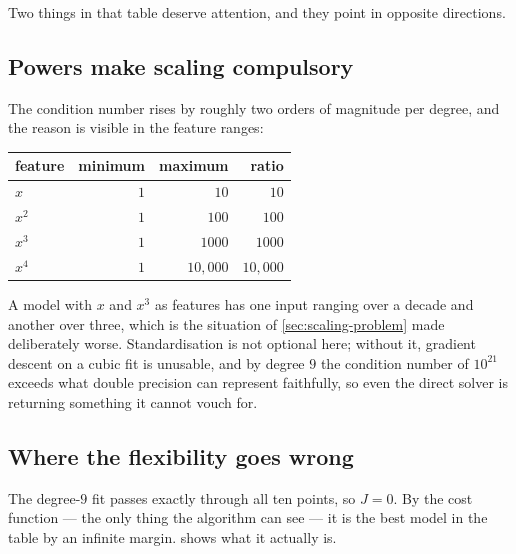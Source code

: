 Two things in that table deserve attention, and they point in opposite
directions.

\subsection{Powers make scaling compulsory}

The condition number rises by roughly two orders of magnitude per degree, and the
reason is visible in the feature ranges:

\begin{center}
\small
\begin{tabular}{@{}lrrr@{}}
\toprule
feature & minimum & maximum & ratio\\
\midrule
$x$   & $1$ & $10$      & $10$\\
$x^2$ & $1$ & $100$     & $100$\\
$x^3$ & $1$ & $1000$    & $1000$\\
$x^4$ & $1$ & $10{,}000$ & $10{,}000$\\
\bottomrule
\end{tabular}
\end{center}

A model with $x$ and $x^3$ as features has one input ranging over a decade and
another over three, which is the situation of \cref{sec:scaling-problem} made
deliberately worse. Standardisation is not optional here; without it, gradient
descent on a cubic fit is unusable, and by degree $9$ the condition number of
$10^{21}$ exceeds what double precision can represent faithfully, so even the
direct solver is returning something it cannot vouch for.

\subsection{Where the flexibility goes wrong}

The degree-$9$ fit passes exactly through all ten points, so $J = 0$. By the cost
function --- the only thing the algorithm can see --- it is the best model in the
table by an infinite margin.  shows what it actually is.

